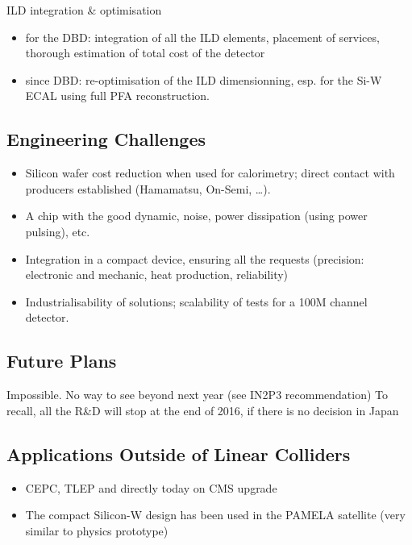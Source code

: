 ILD integration \& optimisation
\begin{itemize}
	\item for the DBD: integration of all the ILD elements, placement of services, thorough estimation of total cost of the detector
	\item since DBD: re-optimisation of the ILD dimensionning, esp. for the Si-W ECAL using full PFA reconstruction.
\end{itemize}

\subsection{Engineering Challenges}
\begin{itemize}
	\item Silicon wafer cost reduction when used for calorimetry; direct contact with producers established (Hamamatsu, On-Semi, \ldots).
	\item A chip with the good dynamic, noise, power dissipation (using power pulsing), etc. 
	\item Integration in a compact device, ensuring all the requests (precision: electronic and mechanic, heat production, reliability)
	\item Industrialisability of solutions; scalability of tests for a 100M channel detector.
\end{itemize}
\subsection{Future Plans}
Impossible. No way to see beyond next year (see IN2P3 recommendation)
To recall, all the R\&D will stop at the end of 2016, if there is no decision in Japan
\subsection{Applications Outside of Linear Colliders}
\begin{itemize}
	\item CEPC, TLEP and directly today on CMS upgrade
	\item The compact Silicon-W design has been used in the PAMELA satellite (very similar to physics prototype)
\end{itemize}
